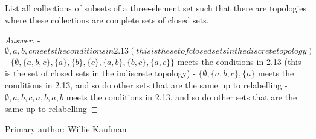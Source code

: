 \begin{minorEx}
    List all collections of subsets of a three-element set such that there are
    topologies where these collections are complete sets of closed sets.
\end{minorEx}
\begin{proof}[Answer]
- ${\emptyset, {a, b, c}} meets the conditions in 2.13 (this is the set of closed sets in the discrete topology)$
- $\{\emptyset, \{a, b, c\}, \{a\}, \{b\}, \{c\}, \{a, b\}, \{b, c\}, \{a, c\}\}$ meets the conditions in 2.13 (this is the set of closed sets in the indiscrete topology)
- $\{\emptyset, \{a, b, c\}, \{a\}$ meets the conditions in 2.13, and so do other sets that are the same up to relabelling
- ${\emptyset, {a, b, c}, {a}, {b}, {a, b}}$ meets the conditions in 2.13, and so do other sets that are the same up to relabelling
\end{proof}

Primary author: Willie Kaufman
